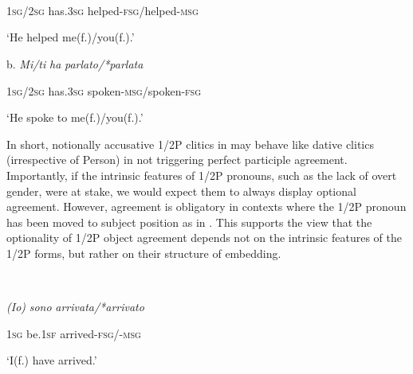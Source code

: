 \documentclass[output=paper]{langscibook}
\begin{document}
\\

\ea\label{ex:manzini:}
{}\\
\z
\ea\label{ex:manzini:}
\\
  \textsc{1sg/2sg}  has\textsc{.3sg}    helped\textsc{{}-fsg/}helped\textsc{{}-msg}

  ‘He helped me(f.)/you(f.).’

  b.  \textit{Mi/ti}        \textit{ha}     \textit{parlato/*parlata}

  \textsc{1sg/2sg}  has\textsc{.3sg}    spoken\textsc{{}-msg/}spoken\textsc{{}-fsg}

  ‘He spoke to me(f.)/you(f.).’
\z 

In short, notionally accusative 1/2P clitics in  may behave like dative clitics (irrespective of Person) in not triggering perfect participle agreement. Importantly, if the intrinsic features of 1/2P pronouns, such as the lack of overt gender, were at stake, we would expect them to always display optional agreement. However, agreement is obligatory in contexts where the 1/2P pronoun has been moved to subject position as in . This supports the view that the optionality of 1/2P object agreement depends not on the intrinsic features of the 1/2P forms, but rather on their structure of embedding.

\ea\label{ex:manzini:}
{}\\
\z

     \textit{(Io)}  \textit{sono}     \textit{arrivata/*arrivato}



  \textsc{1sg}  be.\textsc{1sf}   arrived\textsc{{}-fsg/-msg}


  ‘I(f.) have arrived.’
\end{document}
